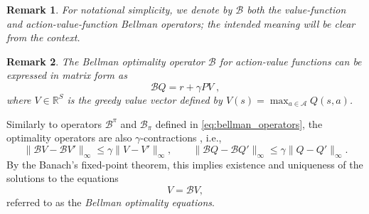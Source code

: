 \documentclass{article}
\numberwithin{equation}{section}
\newtheorem{remark}{Remark}
\newcommand{\cB}{\mathcal{B}}
\newcommand{\eqsp}{\;}
\def\Bp{\cB^\pi}
\def\Bpp{\cB_\pi}
\begin{document}
\begin{remark}
    For notational simplicity, we denote by $\mathcal{B}$ both the value-function and action-value-function Bellman operators; the intended meaning will be clear from the context.
\end{remark}
\begin{remark}\label{remark:matrix_form}
    The Bellman optimality operator \(\mathcal{B}\) for action-value functions can be expressed in matrix form as
    \begin{equation}
        \mathcal{B}Q = r + \gamma P V\eqsp,
    \end{equation}
    where \(V \in \mathbb{R}^{S}\) is the greedy value vector defined by
    \(
        V(s) = \max_{a \in \mathcal{A}} Q(s,a)
    \).
\end{remark}
Similarly to operators \(\Bp\) and \(\Bpp\) defined in \eqref{eq:bellman_operators}, the optimality operators are also $\gamma$-contractions \cite[Proposition 6.2.4]{putermanMDP}, i.e.,
\begin{equation}\label{eq:B_contraction}
    \|\cB V - \cB V'\|_\infty \leq \gamma \| V - V'\|_\infty,\qquad \|\cB Q - \cB Q'\|_\infty \leq \gamma \| Q - Q'\|_\infty.
\end{equation}
By the Banach's fixed-point theorem, this implies existence and uniqueness of the solutions to the equations
\begin{equation}\label{eq:bellman_opt}
    V = \mathcal{B}V,
\end{equation}
referred to as the \emph{Bellman optimality equations}.
\end{document}
